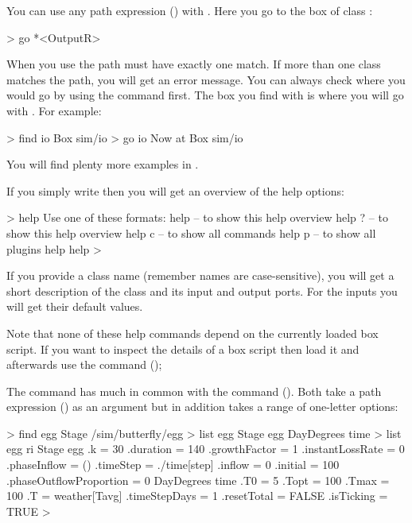 You can use any path expression () with . Here you go to the box of class :
\begin{usdialog}
> go *<OutputR>
\end{usdialog}

When you use  the path must have exactly one match. If more than one class matches the path, you will get an error message. You can always check where you would go by using the  command first. The box you find with  is where you will go with . For example:
\begin{usdialog}
> find io
Box sim/io
> go io
Now at Box sim/io
\end{usdialog}

You will find plenty more examples in .

If you simply write  then you will get an overview of the help options:
\begin{usdialog}
> help 
Use one of these formats:
help    -- to show this help overview
help ?  -- to show this help overview
help c  -- to show all commands
help p  -- to show all plugins
help %
help %
>
\end{usdialog}

If you provide a class name (remember names are case-sensitive), you will get a short description of the class and its input and output ports. For the inputs you will get their default values. 

Note that none of these help commands depend on the currently loaded box script. If you want to inspect the details of a box script then load it and afterwards use the  command ();

The  command has much in common with the  command (). Both take a path expression () as an argument but  in addition takes a range of one-letter options:

\lstset{numbers=left}
\begin{usdialog}
> find egg
Stage /sim/butterfly/egg
> list egg
Stage egg
  DayDegrees time
> list egg ri
Stage egg
  .k = 30
  .duration = 140
  .growthFactor = 1
  .instantLossRate = 0
  .phaseInflow = ()
  .timeStep = ./time[step]
  .inflow = 0
  .initial = 100
  .phaseOutflowProportion = 0
  DayDegrees time
    .T0 = 5
    .Topt = 100
    .Tmax = 100
    .T = weather[Tavg]
    .timeStepDays = 1
    .resetTotal = FALSE
    .isTicking = TRUE
>
\end{usdialog}
\lstset{numbers=none}

